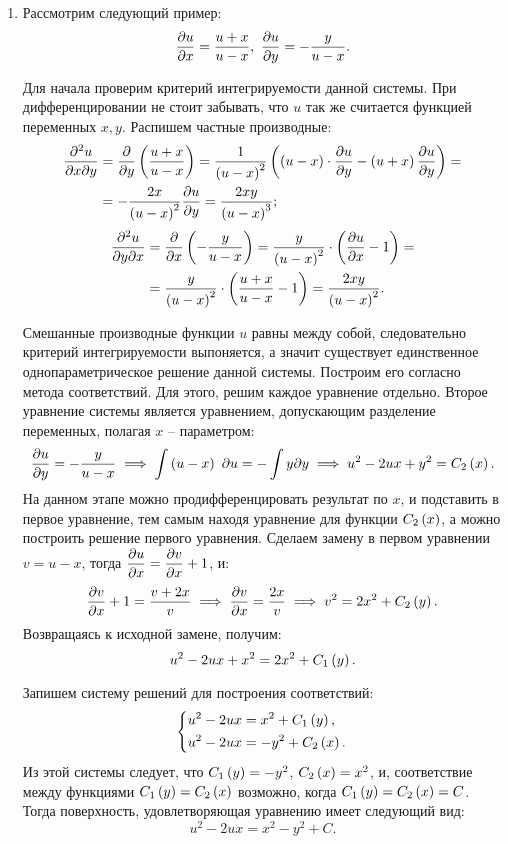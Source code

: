 		\begin{enumerate}

			\item Рассмотрим следующий пример:
				\[ \dfrac{\partial u}{\partial x} = \frac{u + x}{u - x}, ~ \dfrac{\partial u}{\partial y} = - \frac{y}{u - x}. \] %

				Для начала проверим критерий интегрируемости данной системы. При дифференцировании не стоит забывать, что $u$ так же считается функцией переменных $x, y$. Распишем частные производные:
				\[ \begin{split} 
					\dfrac{\partial^2 u}{\partial x \partial y} &= \dfrac{\partial }{\partial y} \left( \frac{u + x}{u - x} \right) = \frac{1}{\left( u - x \right)^2} \left(  \left( u - x \right) \cdot \dfrac{\partial u}{\partial y} - \left( u + x \right) \dfrac{\partial u}{\partial y}  \right) = \\ 
					&= -\frac{2x}{\left( u - x \right)^2} \dfrac{\partial u}{\partial y} = \frac{2xy}{\left( u - x \right)^3};
				\end{split} \]
				\[ \begin{split} 
					\dfrac{\partial^2 u}{\partial y \partial x} &= \dfrac{\partial }{\partial x} \left( -\frac{y}{u - x} \right) = \frac{y}{\left( u - x \right)^2} \cdot \left( \dfrac{\partial u}{\partial x} - 1 \right) = \\ 
					&= \frac{y}{\left( u - x \right)^2} \cdot \left(  \frac{u + x}{u - x} - 1  \right) = \frac{2xy}{\left( u - x \right)^2}.
				\end{split} \]

				Смешанные производные функции $u$ равны между собой, следовательно критерий интегрируемости выпоняется, а значит существует единственное однопараметрическое решение данной системы. Построим его согласно метода соответствий. Для этого, решим каждое уравнение отдельно. Второе уравнение системы является уравнением, допускающим разделение переменных, полагая $x$ -- параметром:
				\[ \dfrac{\partial u}{\partial y} = - \frac{y}{u - x} \implies \int \left( u - x \right) ~ \partial u = - \int y \partial y \implies u^2 - 2ux + y^2 = C_2 \left( x \right). \]
				На данном этапе можно продифференцировать результат по $x$, и подставить в первое уравнение, тем самым находя уравнение для функции $C_2 \left( x \right)$, а можно построить решение первого уравнения. Сделаем замену в первом уравнении $v = u - x$, тогда $\dfrac{\partial u}{\partial x} = \dfrac{\partial v}{\partial x} + 1$, и:
				\[ \dfrac{\partial v}{\partial x} + 1 = \frac{v + 2x}{v} \implies \dfrac{\partial v}{\partial x} = \frac{2x}{v} \implies v^2 = 2x^2 + C_2 \left( y \right). \]
				Возвращаясь к исходной замене, получим:
				\[ u^2 - 2ux + x^2 = 2x^2 + C_1\left( y \right). \]

				Запишем систему решений для построения соответствий:
				\[ \left\lbrace \begin{split}
					u^2 - 2ux &= x^2 + C_1 \left( y \right), \\
					u^2 - 2ux &= -y^2 + C_2 \left( x \right).
				\end{split} \right. \]
				Из этой системы следует, что $C_1 \left( y \right) = -y^2$, $C_2 \left( x \right) = x^2$, и, соответствие между функциями $C_1 \left( y \right) = C_2 \left( x \right)$ возможно, когда $C_1 \left( y \right) = C_2 \left( x \right) = C$. Тогда поверхность, удовлетворяющая уравнению имеет следующий вид:
				\[ u^2 - 2ux = x^2 - y^2 + C. \] 


\end{enumerate}

